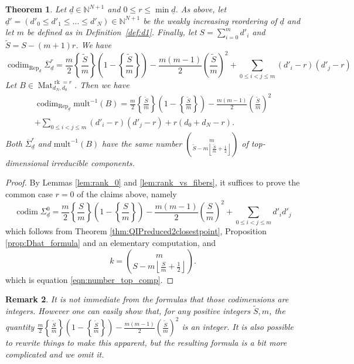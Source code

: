 \documentclass[a4paper]{amsart}
\DeclareMathOperator{\rk}{rk}
\DeclareMathOperator{\Rep}{\mathrm{Rep}}
\DeclareMathOperator{\Mat}{\mathrm{Mat}}
\DeclareMathOperator{\codim}{\mathrm{codim}}
\newcommand{\N}{\mathbb{N}}
\newcommand{\ud}{\underline{d}}
\newcommand{\mult}{\mathrm{mult}}
\newcommand{\cSigma}{\overline{\Sigma}}
\newtheorem{thm}{Theorem}[section]
\theoremstyle{plain}
\newtheorem{remark}[thm]{Remark}
\begin{document}
\begin{thm} \label{thm:main-codim}
Let $\ud\in \N^{N+1}$ and $0\leq r\leq \min \ud$. As above, let $\ud'=(d'_0\leq d'_1 \leq \ldots\leq d'_N)\in \N^{N+1}$ be the weakly increasing reordering of $\ud$ and let $m$ be defined as in Definition~\ref{def:d1}. Finally, let $S=\sum_{i=0}^{m}d'_i$ and $\tilde{S}=S-(m+1)r$. We have
\[
    \codim_{\Rep_{\ud}}  \cSigma^r_{\ud} = \frac{m}{2}\left\{\frac{\tilde{S}}{m} \right\}\left(1-\left\{\frac{\tilde{S}}{m} \right\}\right) - \frac{m(m-1)}{2}\left(\frac{\tilde{S}}{m}\right)^2 + \sum_{0\leq i<j\leq m}(d'_i-r)(d'_j-r)
\] 
Let $B\in\Mat_{d_N,d_0}^{\rk=r}$. Then we have
\begin{multline}\label{eqn:codim_fiber}
\codim_{\Rep_{\ud}} \mult^{-1}(B) =  
\frac{m}{2}\left\{\frac{\tilde{S}}{m} \right\}\left(1-\left\{\frac{\tilde{S}}{m} \right\}\right) - \frac{m(m-1)}{2}\left(\frac{\tilde{S}}{m}\right)^2 
\\
+ \sum_{0\leq i<j\leq m}(d'_i-r)(d'_j-r) + r(d_0+d_N-r).
\end{multline}
Both $\cSigma^r_{\ud}$ and $\mult^{-1}(B)$ have the same number $\binom{m}{\tilde{S}-m\left\lfloor \frac{\tilde{S}}{m}+\frac{1}{2}\right\rfloor}$ of top-dimensional irreducible components.
\end{thm}
\begin{proof}
By Lemmas \ref{lem:rank_0} and \ref{lem:rank_vs_fibers}, it suffices to prove the common case $r=0$ of the claims above, namely
\[
    \codim \Sigma^0_{\ud} = \frac{m}{2}\left\{\frac{S}{m} \right\}\left(1-\left\{\frac{S}{m} \right\}\right) - \frac{m(m-1)}{2}\left(\frac{S}{m}\right)^2 + \sum_{0\leq i<j\leq m}d'_i d'_j
\]
which follows from Theorem \ref{thm:QIPreduced2closestpoint}, Proposition \ref{prop:Dhat_formula} and an elementary computation, and
\[
k=\binom{m}{S-m\left\lfloor \frac{S}{m}+\frac{1}{2}\right\rfloor}.
\]
which is equation \eqref{eqn:number_top_comp}.
\end{proof}

\begin{remark} \rm
    It is not immediate from the formulas that those codimensions are integers. However one can easily show that, for any positive integers $\tilde{S},m$, the quantity $\frac{m}{2}\left\{\frac{\tilde{S}}{m} \right\}\left(1-\left\{\frac{\tilde{S}}{m} \right\}\right) - \frac{m(m-1)}{2}\left(\frac{\tilde{S}}{m}\right)^2$ is an integer. It is also possible to rewrite things to make this apparent, but the resulting formula is a bit more complicated and we omit it.
\end{remark}
\end{document}
